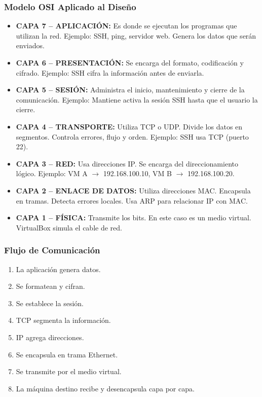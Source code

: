 \documentclass[stu, 12pt, letterpaper, donotrepeattitle, floatsintext, noapacite]{apa7}
\begin{document}
\subsubsection{Modelo OSI Aplicado al Diseño}
\begin{itemize}
    \item \textbf{CAPA 7 -- APLICACIÓN:} Es donde se ejecutan los programas que utilizan la red. Ejemplo: SSH, ping, servidor web. Genera los datos que serán enviados.
    \item \textbf{CAPA 6 -- PRESENTACIÓN:} Se encarga del formato, codificación y cifrado. Ejemplo: SSH cifra la información antes de enviarla.
    \item \textbf{CAPA 5 -- SESIÓN:} Administra el inicio, mantenimiento y cierre de la comunicación. Ejemplo: Mantiene activa la sesión SSH hasta que el usuario la cierre.
    \item \textbf{CAPA 4 -- TRANSPORTE:} Utiliza TCP o UDP. Divide los datos en segmentos. Controla errores, flujo y orden. Ejemplo: SSH usa TCP (puerto 22).
    \item \textbf{CAPA 3 -- RED:} Usa direcciones IP. Se encarga del direccionamiento lógico. Ejemplo: VM A $\rightarrow$ 192.168.100.10, VM B $\rightarrow$ 192.168.100.20.
    \item \textbf{CAPA 2 -- ENLACE DE DATOS:} Utiliza direcciones MAC. Encapsula en tramas. Detecta errores locales. Usa ARP para relacionar IP con MAC.
    \item \textbf{CAPA 1 -- FÍSICA:} Transmite los bits. En este caso es un medio virtual. VirtualBox simula el cable de red.
\end{itemize}

\subsubsection{Flujo de Comunicación}
\begin{enumerate}
    \item La aplicación genera datos.
    \item Se formatean y cifran.
    \item Se establece la sesión.
    \item TCP segmenta la información.
    \item IP agrega direcciones.
    \item Se encapsula en trama Ethernet.
    \item Se transmite por el medio virtual.
    \item La máquina destino recibe y desencapsula capa por capa.
\end{enumerate}
\end{document}
